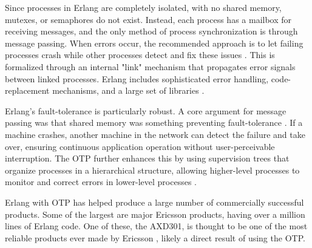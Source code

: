 \documentclass[]{final}
\begin{document}
Since processes in Erlang are completely isolated, with no shared memory, mutexes,
or semaphores do not exist. Instead, each process has a mailbox for receiving messages,
and the only method of process synchronization is through message passing.
When errors occur, the recommended approach is to let failing processes
crash while other processes detect and fix these issues \cite{armstrong_erlang_2010}.
This is formalized
through an internal "link" mechanism that propagates error signals between
linked processes. Erlang includes sophisticated error handling, code-replacement
mechanisms, and a large set of libraries \cite{armstrong_erlang_2010}.

\label{faultErlang}

Erlang's fault-tolerance is particularly robust.
A core argument for message passing was that shared memory was something
preventing fault-tolerance \cite{armstrong_erlang_2010}.
If a machine crashes, another
machine in the network can detect the failure and take over, ensuring continuous
application operation without user-perceivable interruption. The OTP further
enhances this by using supervision trees that
organize processes in a hierarchical structure, allowing higher-level processes
to monitor and correct errors in lower-level processes \cite{armstrong_erlang_2010}.

Erlang with OTP has helped produce a large number of commercially successful products.
Some of the largest are major Ericsson products, having over a million lines
of Erlang code. One of these, the AXD301, is thought to be one of the most
reliable products ever made by Ericsson \cite{armstrong_making_2003},
likely a direct result of using the OTP.
\end{document}
